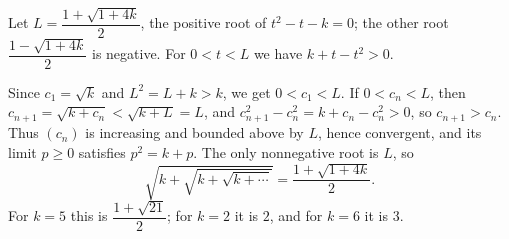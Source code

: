 Let $L=\dfrac{1+\sqrt{1+4k}}{2}$, the positive root of $t^2-t-k=0$; the other root $\dfrac{1-\sqrt{1+4k}}{2}$ is negative. For $0<t<L$ we have $k+t-t^2>0$.

Since $c_1=\sqrt k$ and $L^2=L+k>k$, we get $0<c_1<L$. If $0<c_n<L$, then $c_{n+1}=\sqrt{k+c_n}<\sqrt{k+L}=L$, and $c_{n+1}^2-c_n^2=k+c_n-c_n^2>0$, so $c_{n+1}>c_n$. Thus $(c_n)$ is increasing and bounded above by $L$, hence convergent, and its limit $p\ge0$ satisfies $p^2=k+p$. The only nonnegative root is $L$, so
\[
\sqrt{k+\sqrt{k+\sqrt{k+\cdots}}}=\boxed{\dfrac{1+\sqrt{1+4k}}{2}}.
\]
For $k=5$ this is $\dfrac{1+\sqrt{21}}{2}$; for $k=2$ it is $2$, and for $k=6$ it is $3$.
